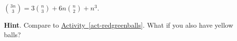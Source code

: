 \documentclass{book}
\begin{document}
\setcounter{cpjt}{104}
\addtocounter{cpjt}{-1}
\begin{activity}\label{activity-97}
\hypertarget{p-721}{}%
\(\binom{3n}{3} = 3 \binom{n}{3} + 6n \binom{n}{2} + n^{3}\).%
\par\smallskip%
\noindent\textbf{Hint}.\hypertarget{hint-58}{}\quad%
\hypertarget{p-722}{}%
Compare to \hyperref[act-redgreenballs]{Activity~\ref{act-redgreenballs}}.  What if you also have yellow balls?%
\par\smallskip%
\noindent\end{activity}

\clearpage
\end{document}
